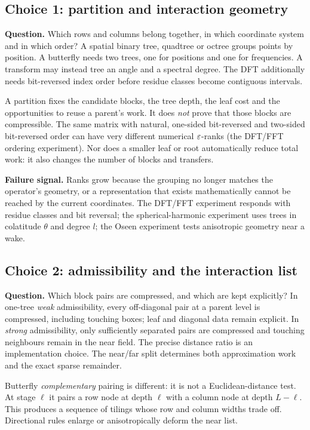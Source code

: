 \subsection{Choice 1: partition and interaction geometry}
\textbf{Question.} Which rows and columns belong together, in which coordinate system and in which order? A spatial binary tree, quadtree or octree groups points by position. A butterfly needs two trees, one for positions and one for frequencies. A transform may instead tree an angle and a spectral degree. The DFT additionally needs bit-reversed index order before residue classes become contiguous intervals.

A partition fixes the candidate blocks, the tree depth, the leaf cost and the opportunities to reuse a parent's work. It does \emph{not} prove that those blocks are compressible. The same matrix with natural, one-sided bit-reversed and two-sided bit-reversed order can have very different numerical $\varepsilon$-ranks (the DFT/FFT ordering experiment). Nor does a smaller leaf or root automatically reduce total work: it also changes the number of blocks and transfers.

\textbf{Failure signal.} Ranks grow because the grouping no longer matches the operator's geometry, or a representation that exists mathematically cannot be reached by the current coordinates. The DFT/FFT experiment responds with residue classes and bit reversal; the spherical-harmonic experiment uses trees in colatitude $\theta$ and degree $l$; the Oseen experiment tests anisotropic geometry near a wake.

\subsection{Choice 2: admissibility and the interaction list}
\textbf{Question.} Which block pairs are compressed, and which are kept explicitly? In one-tree \emph{weak} admissibility, every off-diagonal pair at a parent level is compressed, including touching boxes; leaf and diagonal data remain explicit. In \emph{strong} admissibility, only sufficiently separated pairs are compressed and touching neighbours remain in the near field. The precise distance ratio is an implementation choice. The near/far split determines both approximation work and the exact sparse remainder.

Butterfly \emph{complementary} pairing is different: it is not a Euclidean-distance test. At stage $\ell$ it pairs a row node at depth $\ell$ with a column node at depth $L-\ell$. This produces a sequence of tilings whose row and column widths trade off. Directional rules enlarge or anisotropically deform the near list.

